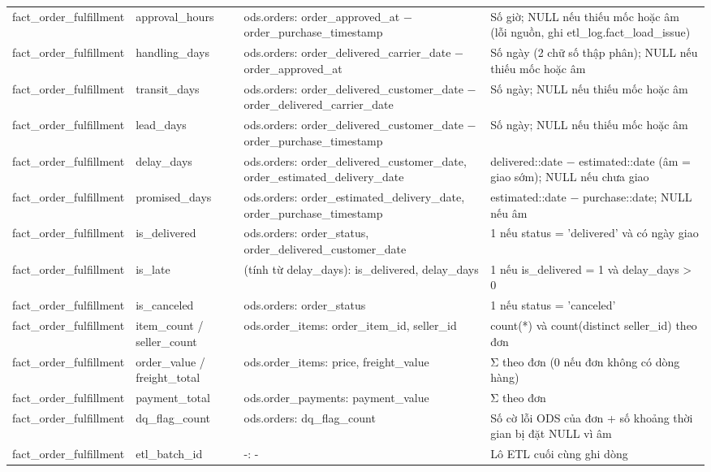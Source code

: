 {\begin{longtable}{p{2.4cm}p{3.1cm}p{3.6cm}p{5.4cm}}
fact\_order\_fulfillment & approval\_hours & ods.orders: order\_approved\_at − order\_purchase\_timestamp & Số giờ; NULL nếu thiếu mốc hoặc âm (lỗi nguồn, ghi etl\_log.fact\_load\_issue) \\
fact\_order\_fulfillment & handling\_days & ods.orders: order\_delivered\_carrier\_date − order\_approved\_at & Số ngày (2 chữ số thập phân); NULL nếu thiếu mốc hoặc âm \\
fact\_order\_fulfillment & transit\_days & ods.orders: order\_delivered\_customer\_date − order\_delivered\_carrier\_date & Số ngày; NULL nếu thiếu mốc hoặc âm \\
fact\_order\_fulfillment & lead\_days & ods.orders: order\_delivered\_customer\_date − order\_purchase\_timestamp & Số ngày; NULL nếu thiếu mốc hoặc âm \\
fact\_order\_fulfillment & delay\_days & ods.orders: order\_delivered\_customer\_date, order\_estimated\_delivery\_date & delivered::date − estimated::date (âm = giao sớm); NULL nếu chưa giao \\
fact\_order\_fulfillment & promised\_days & ods.orders: order\_estimated\_delivery\_date, order\_purchase\_timestamp & estimated::date − purchase::date; NULL nếu âm \\
fact\_order\_fulfillment & is\_delivered & ods.orders: order\_status, order\_delivered\_customer\_date & 1 nếu status = 'delivered' và có ngày giao \\
fact\_order\_fulfillment & is\_late & (tính từ delay\_days): is\_delivered, delay\_days & 1 nếu is\_delivered = 1 và delay\_days > 0 \\
fact\_order\_fulfillment & is\_canceled & ods.orders: order\_status & 1 nếu status = 'canceled' \\
fact\_order\_fulfillment & item\_count / seller\_count & ods.order\_items: order\_item\_id, seller\_id & count(*) và count(distinct seller\_id) theo đơn \\
fact\_order\_fulfillment & order\_value / freight\_total & ods.order\_items: price, freight\_value & Σ theo đơn (0 nếu đơn không có dòng hàng) \\
fact\_order\_fulfillment & payment\_total & ods.order\_payments: payment\_value & Σ theo đơn \\
fact\_order\_fulfillment & dq\_flag\_count & ods.orders: dq\_flag\_count & Số cờ lỗi ODS của đơn + số khoảng thời gian bị đặt NULL vì âm \\
fact\_order\_fulfillment & etl\_batch\_id & -: - & Lô ETL cuối cùng ghi dòng \\

\end{longtable}}
